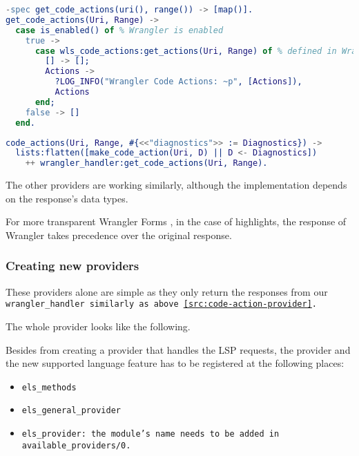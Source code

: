 \begin{lstlisting}[language=erlang]
-spec get_code_actions(uri(), range()) -> [map()].
get_code_actions(Uri, Range) ->
  case is_enabled() of % Wrangler is enabled
    true ->
      case wls_code_actions:get_actions(Uri, Range) of % defined in Wrangler
        [] -> [];
        Actions ->
          ?LOG_INFO("Wrangler Code Actions: ~p", [Actions]),
          Actions
      end;
    false -> []
  end.
\end{lstlisting}

\begin{lstlisting}[language=erlang]
code_actions(Uri, Range, #{<<"diagnostics">> := Diagnostics}) ->
  lists:flatten([make_code_action(Uri, D) || D <- Diagnostics])
    ++ wrangler_handler:get_code_actions(Uri, Range).
\end{lstlisting}

The other providers are working similarly, although the implementation depends on the response's data types.

\begin{note}
For more transparent Wrangler Forms , in the case of highlights, the response of Wrangler takes precedence over the original response. 
\end{note}

\subsubsection{Creating new providers}

These providers alone are simple as they only return the responses from our \tt wrangler\_handler\rm\ similarly as above \ref{src:code-action-provider}.

The whole provider looks like the following.

Besides from creating a provider that handles the LSP requests, the provider and the new supported language feature has to be registered at the following places: 

\begin{itemize}
    \item \tt els\_methods\rm
    \item \tt els\_general\_provider\rm {}
    \item \tt els\_provider\rm : the module's name needs to be added in \tt available\_providers/0\rm . 
\end{itemize}


